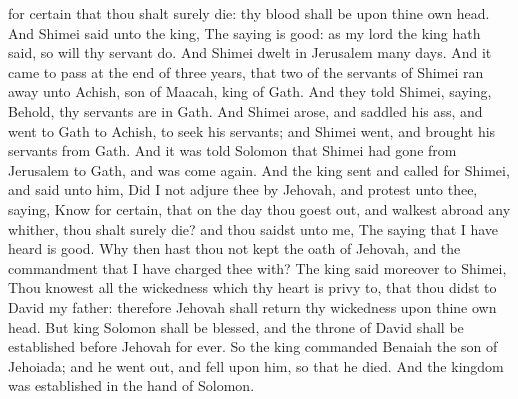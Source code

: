 for certain that thou shalt surely die: thy blood shall be upon thine own head. And Shimei said unto the king, The saying is good: as my lord the king hath said, so will thy servant do. And Shimei dwelt in Jerusalem many days.  And it came to pass at the end of three years, that two of the servants of Shimei ran away unto Achish, son of Maacah, king of Gath. And they told Shimei, saying, Behold, thy servants are in Gath. And Shimei arose, and saddled his ass, and went to Gath to Achish, to seek his servants; and Shimei went, and brought his servants from Gath. And it was told Solomon that Shimei had gone from Jerusalem to Gath, and was come again. And the king sent and called for Shimei, and said unto him, Did I not adjure thee by Jehovah, and protest unto thee, saying, Know for certain, that on the day thou goest out, and walkest abroad any whither, thou shalt surely die? and thou saidst unto me, The saying that I have heard is good. Why then hast thou not kept the oath of Jehovah, and the commandment that I have charged thee with? The king said moreover to Shimei, Thou knowest all the wickedness which thy heart is privy to, that thou didst to David my father: therefore Jehovah shall return thy wickedness upon thine own head. But king Solomon shall be blessed, and the throne of David shall be established before Jehovah for ever. So the king commanded Benaiah the son of Jehoiada; and he went out, and fell upon him, so that he died. And the kingdom was established in the hand of Solomon. 

